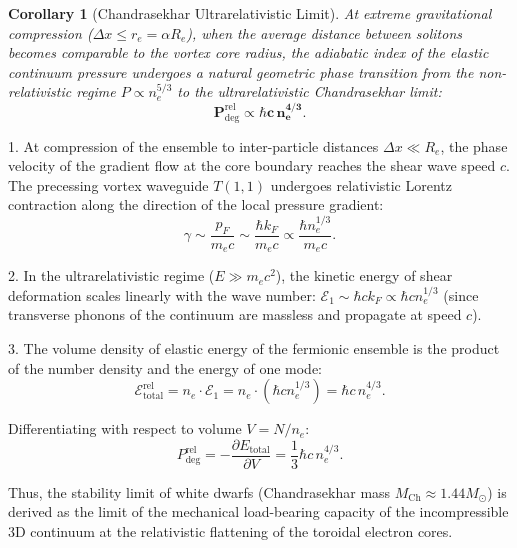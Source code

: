 \documentclass[12pt,a4paper]{article}
\newtheorem{corollary}{Corollary}
\begin{document}
								
	\begin{corollary}[Chandrasekhar Ultrarelativistic Limit]
	At extreme gravitational compression ($\Delta x \le r_e = \alpha R_e$), when the average distance between solitons becomes comparable to the vortex core radius, the adiabatic index of the elastic continuum pressure undergoes a natural geometric phase transition from the non-relativistic regime $P \propto n_e^{5/3}$ to the ultrarelativistic Chandrasekhar limit:
	\begin{equation}
	\mathbf{P_{\mathrm{deg}}^{\mathrm{rel}} \propto \hbar c \, n_e^{4/3}}.
	\end{equation}
	\end{corollary}
	1. At compression of the ensemble to inter-particle distances $\Delta x \ll R_e$, the phase velocity of the gradient flow at the core boundary reaches the shear wave speed $c$. The precessing vortex waveguide $T(1,1)$ undergoes relativistic Lorentz contraction along the direction of the local pressure gradient:
	\begin{equation}
	\gamma \sim \frac{p_F}{m_e c} \sim \frac{\hbar k_F}{m_e c} \propto \frac{\hbar n_e^{1/3}}{m_e c}.
	\end{equation}
				
	2. In the ultrarelativistic regime ($E \gg m_e c^2$), the kinetic energy of shear deformation scales linearly with the wave number: $\mathcal{E}_1 \sim \hbar c k_F \propto \hbar c n_e^{1/3}$ (since transverse phonons of the continuum are massless and propagate at speed $c$).
									
	3. The volume density of elastic energy of the fermionic ensemble is the product of the number density and the energy of one mode:
	\begin{equation}
	\mathcal{E}_{\text{total}}^{\text{rel}} = n_e \cdot \mathcal{E}_1 = n_e \cdot \left( \hbar c n_e^{1/3} \right) = \hbar c \, n_e^{4/3}.
	\end{equation}
									
	Differentiating with respect to volume $V = N / n_e$:
	\begin{equation}
	P_{\text{deg}}^{\text{rel}} = -\frac{\partial E_{\text{total}}}{\partial V} = \frac{1}{3} \hbar c \, n_e^{4/3}.
	\end{equation}
								
	Thus, the stability limit of white dwarfs (Chandrasekhar mass $M_{\text{Ch}} \approx 1.44 M_\odot$) is derived as the limit of the mechanical load-bearing capacity of the incompressible 3D continuum at the relativistic flattening of the toroidal electron cores.
									
\end{document}

